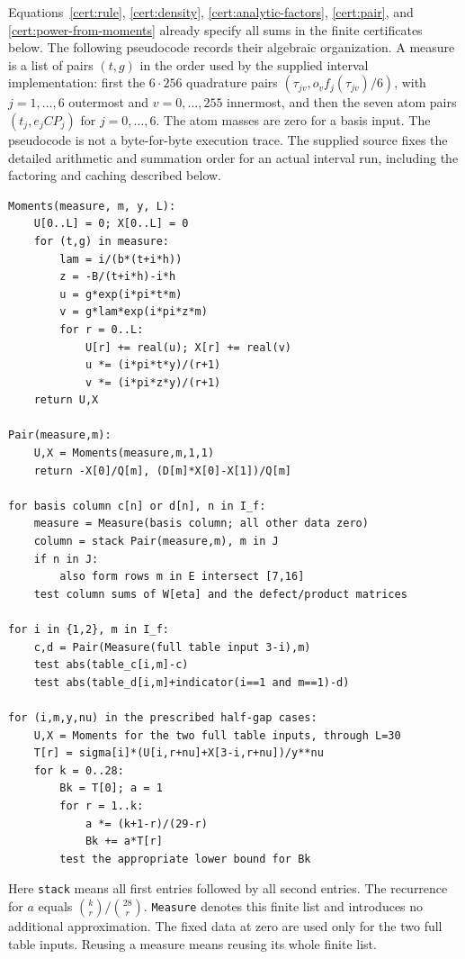 Equations~\eqref{cert:rule}, \eqref{cert:density},
\eqref{cert:analytic-factors}, \eqref{cert:pair}, and
\eqref{cert:power-from-moments} already specify all
sums in the finite certificates below.  The following pseudocode records their
algebraic organization.  A measure is a list of pairs $(t,g)$ in the order
used by the supplied interval implementation: first the $6\cdot256$
quadrature pairs $(\tau_{jv},o_v f_j(\tau_{jv})/6)$, with
$j=1,\ldots,6$ outermost and $v=0,\ldots,255$ innermost, and then the seven
atom pairs $(t_j,e_jCP_j)$ for $j=0,\ldots,6$.  The atom masses are zero for
a basis input.  The pseudocode is not a byte-for-byte execution trace.
The supplied source fixes the detailed arithmetic and summation order for
an actual interval run, including the factoring and caching described below.

\noindent
\begin{minipage}{\linewidth}
\begin{lstlisting}[basicstyle=\ttfamily\footnotesize]
Moments(measure, m, y, L):
    U[0..L] = 0; X[0..L] = 0
    for (t,g) in measure:
        lam = i/(b*(t+i*h))
        z = -B/(t+i*h)-i*h
        u = g*exp(i*pi*t*m)
        v = g*lam*exp(i*pi*z*m)
        for r = 0..L:
            U[r] += real(u); X[r] += real(v)
            u *= (i*pi*t*y)/(r+1)
            v *= (i*pi*z*y)/(r+1)
    return U,X

Pair(measure,m):
    U,X = Moments(measure,m,1,1)
    return -X[0]/Q[m], (D[m]*X[0]-X[1])/Q[m]

for basis column c[n] or d[n], n in I_f:
    measure = Measure(basis column; all other data zero)
    column = stack Pair(measure,m), m in J
    if n in J:
        also form rows m in E intersect [7,16]
    test column sums of W[eta] and the defect/product matrices

for i in {1,2}, m in I_f:
    c,d = Pair(Measure(full table input 3-i),m)
    test abs(table_c[i,m]-c)
    test abs(table_d[i,m]+indicator(i==1 and m==1)-d)

for (i,m,y,nu) in the prescribed half-gap cases:
    U,X = Moments for the two full table inputs, through L=30
    T[r] = sigma[i]*(U[i,r+nu]+X[3-i,r+nu])/y**nu
    for k = 0..28:
        Bk = T[0]; a = 1
        for r = 1..k:
            a *= (k+1-r)/(29-r)
            Bk += a*T[r]
        test the appropriate lower bound for Bk
\end{lstlisting}
\end{minipage}

Here \texttt{stack} means all first entries followed by all second entries.
The recurrence for $a$ equals $\binom{k}{r}/\binom{28}{r}$.
\texttt{Measure} denotes this finite list and introduces no additional
approximation.  The fixed data at zero are used only for the two full
table inputs.  Reusing a measure means reusing its whole finite list.

